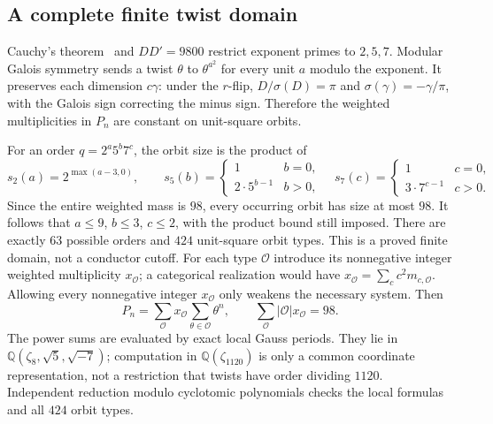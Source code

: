 \subsection{A complete finite twist domain}
Cauchy's theorem~\cite[Theorem~3.9]{BNRWCauchy} and
$DD'=9800$ restrict exponent primes to $2,5,7$.
Modular Galois symmetry sends a twist $\theta$ to $\theta^{a^2}$
for every unit $a$ modulo the exponent. It preserves each dimension
$c\gamma$: under the $r$-flip, $D/\sigma(D)=\pi$ and
$\sigma(\gamma)=-\gamma/\pi$, with the Galois sign correcting the
minus sign. Therefore the weighted multiplicities in $P_n$ are constant
on unit-square orbits.

For an order $q=2^a5^b7^c$, the orbit size is the product of
\[
 s_2(a)=2^{\max(a-3,0)},\qquad
 s_5(b)=\begin{cases}1&b=0,\\2\cdot5^{b-1}&b>0,\end{cases}
 \quad
 s_7(c)=\begin{cases}1&c=0,\\3\cdot7^{c-1}&c>0.\end{cases}
\]
Since the entire weighted mass is $98$, every occurring orbit has size
at most $98$. It follows that $a\leq9$, $b\leq3$, $c\leq2$, with
the product bound still imposed. There are exactly $63$ possible orders
and $424$ unit-square orbit types. This is a proved finite domain, not a
conductor cutoff. For each type $\mathcal O$ introduce its nonnegative
integer weighted multiplicity $x_{\mathcal O}$; a categorical realization
would have $x_{\mathcal O}=\sum_c c^2m_{c,\mathcal O}$. Allowing every
nonnegative integer $x_{\mathcal O}$ only weakens the necessary system.
Then
\[
 P_n=\sum_{\mathcal O}x_{\mathcal O}
             \sum_{\theta\in\mathcal O}\theta^n,
 \qquad \sum_{\mathcal O}|\mathcal O|x_{\mathcal O}=98.
\]
The power sums are evaluated by exact local Gauss periods. They lie in
$\mathbb Q(\zeta_8,\sqrt5,\sqrt{-7})$; computation in
$\mathbb Q(\zeta_{1120})$ is only a common coordinate representation,
not a restriction that twists have order dividing $1120$.
Independent reduction modulo cyclotomic polynomials checks the local
formulas and all $424$ orbit types.

